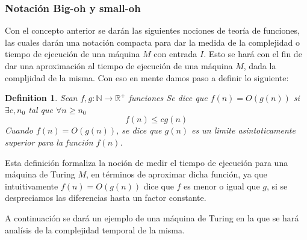 \documentclass[10pt]{report}
\newtheorem{definition}{Definition}
\begin{document}
    \subsubsection{Notación Big-oh y small-oh}
    Con el concepto anterior se darán las siguientes nociones de teoría de funciones, las cuales darán una notación
    compacta para dar la medida de la complejidad o tiempo de ejecución de una máquina $M$ con entrada $I$.
    Esto se hará con el fin de dar una aproximación al tiempo de ejecución de una máquina $M$, dada la compljidad de la
    misma.
    \newline
    Con eso en mente damos paso a definir lo siguiente:
    \begin{definition}
        Sean $f,g:\mathbb{N}\rightarrow\mathbb{R}^+$ funciones\newline
        Se dice que $f(n) = O(g(n))$ \newline
        si $\exists c, n_{0}$ tal que $\forall n \geq n_{0}$
        \begin{equation}
            f(n) \leq cg(n)\label{eq:equation6}
        \end{equation}
        Cuando $f(n) = O(g(n))$, se dice que $g(n)$ es un limite asintoticamente superior
        para la función $f(n)$.
    \end{definition}
    Esta definición formaliza la noción de medir el tiempo de ejecución para una máquina de Turing $M$, en términos
    de aproximar dicha función, ya que intuitivamente $f(n) = O(g(n)) $ dice que $f$ es menor o igual que $g$, si se
    despreciamos las diferencias hasta un factor constante.

    A continuación se dará un ejemplo de una máquina de Turing en la que se hará analísis de la complejidad temporal
    de la misma.
\end{document}
